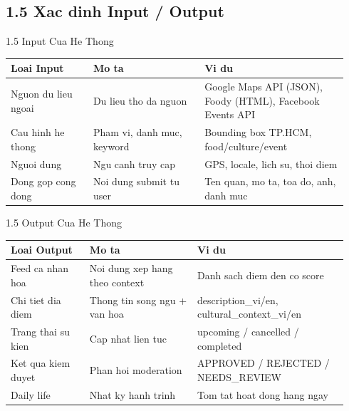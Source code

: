 \subsection{1.5 Xac dinh Input / Output}

\begin{frame}[t]{1.5 Input Cua He Thong}
\footnotesize
\begin{table}[]
\centering
\begin{tabular}{p{0.23\linewidth} p{0.31\linewidth} p{0.40\linewidth}}
\toprule
\textbf{Loai Input} & \textbf{Mo ta} & \textbf{Vi du} \\
\midrule
Nguon du lieu ngoai & Du lieu tho da nguon & Google Maps API (JSON), Foody (HTML), Facebook Events API \\
Cau hinh he thong & Pham vi, danh muc, keyword & Bounding box TP.HCM, food/culture/event \\
Nguoi dung & Ngu canh truy cap & GPS, locale, lich su, thoi diem \\
Dong gop cong dong & Noi dung submit tu user & Ten quan, mo ta, toa do, anh, danh muc \\
\bottomrule
\end{tabular}
\end{table}
\end{frame}

\begin{frame}[t]{1.5 Output Cua He Thong}
\footnotesize
\begin{table}[]
\centering
\begin{tabular}{p{0.22\linewidth} p{0.30\linewidth} p{0.42\linewidth}}
\toprule
\textbf{Loai Output} & \textbf{Mo ta} & \textbf{Vi du} \\
\midrule
Feed ca nhan hoa & Noi dung xep hang theo context & Danh sach diem den co score \\
Chi tiet dia diem & Thong tin song ngu + van hoa & description\_vi/en, cultural\_context\_vi/en \\
Trang thai su kien & Cap nhat lien tuc & upcoming / cancelled / completed \\
Ket qua kiem duyet & Phan hoi moderation & APPROVED / REJECTED / NEEDS\_REVIEW \\
Daily life & Nhat ky hanh trinh & Tom tat hoat dong hang ngay \\
\bottomrule
\end{tabular}
\end{table}
\end{frame}

